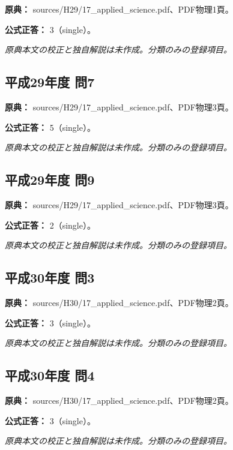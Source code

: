 \noindent\textbf{原典：} sources/H29/17\_applied\_science.pdf、PDF物理1頁。

\textbf{公式正答：} 3（single）。

\par\textit{原典本文の校正と独自解説は未作成。分類のみの登録項目。}

\subsection{平成29年度 問7}
\label{q:h29-reg-applied-07}

\noindent\textbf{原典：} sources/H29/17\_applied\_science.pdf、PDF物理3頁。

\textbf{公式正答：} 5（single）。

\par\textit{原典本文の校正と独自解説は未作成。分類のみの登録項目。}

\subsection{平成29年度 問9}
\label{q:h29-reg-applied-09}

\noindent\textbf{原典：} sources/H29/17\_applied\_science.pdf、PDF物理3頁。

\textbf{公式正答：} 2（single）。

\par\textit{原典本文の校正と独自解説は未作成。分類のみの登録項目。}

\subsection{平成30年度 問3}
\label{q:h30-reg-applied-03}

\noindent\textbf{原典：} sources/H30/17\_applied\_science.pdf、PDF物理2頁。

\textbf{公式正答：} 3（single）。

\par\textit{原典本文の校正と独自解説は未作成。分類のみの登録項目。}

\subsection{平成30年度 問4}
\label{q:h30-reg-applied-04}

\noindent\textbf{原典：} sources/H30/17\_applied\_science.pdf、PDF物理2頁。

\textbf{公式正答：} 3（single）。

\par\textit{原典本文の校正と独自解説は未作成。分類のみの登録項目。}

